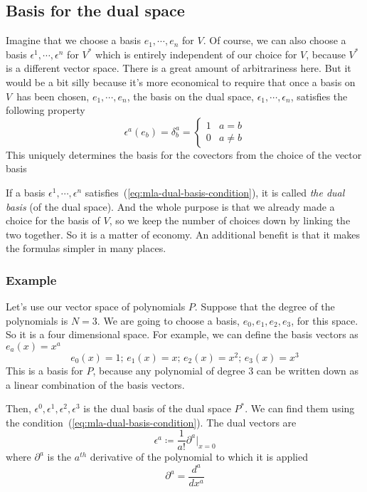 \subsection{Basis for the dual space}
Imagine that we choose a basis $e_1,\cdots,e_n$ for $V$. Of course,  we can also choose a
basis $\epsilon^1,\cdots,\epsilon^n$ for $V^\ast$ which is entirely independent of our choice
for $V$, because $V^\ast$ is a different vector space. There is a great amount of arbitrariness here.
But it would be a bit silly because it's more economical to require that once a basis on $V$\, has
been chosen, $e_1,\cdots,e_n$, the basis on the dual space, $\epsilon_1,\cdots,\epsilon_n$,
satisfies the following property
\begin{equation}\label{eq:mla-dual-basis-condition}
  \epsilon^a (e_b) = \delta_b^a
  = \left\{
    \begin{array}{cc}
      1 & a = b\\
      0 & a \neq b
    \end{array}
  \right.
\end{equation}
This uniquely determines the basis for the covectors from the choice of the vector basis

If a basis $\epsilon^1,\cdots,\epsilon^n$ satisfies~(\ref{eq:mla-dual-basis-condition}), it is
called \emph{the dual basis} (of the dual space). And the whole purpose is that we already
made a choice for the basis of $V$, so we keep the number of choices down by linking the two
together. So it is a matter of economy. An additional benefit is that it makes the formulas simpler
in many places.

\subsubsection{Example}
Let's use our vector space of polynomials $P$. Suppose that the degree of the polynomials is $N=3$.
We are going to choose a basis, $e_0, e_1, e_2, e_3$, for this space. So it is a four dimensional
space.
For example, we can define the basis vectors as $e_a(x) = x^a$
\[
  e_0(x) = 1;\, e_1(x) = x;\, e_2(x) = x^2;\, e_3(x) = x^3
\]
This is a basis for $P$, because any polynomial of degree 3 can be written down as a linear
combination of the basis vectors.

Then, $\epsilon^0, \epsilon^1, \epsilon^2, \epsilon^3$ is the dual basis of the dual space $P^\ast$.
We can find them using the condition~(\ref{eq:mla-dual-basis-condition}).
The dual vectors are
\[
  \epsilon^a \coloneq \frac{1}{a!} \partial^a\big|_{x=0}
\]
where $\partial^a$ is the $a^{th}$ derivative of the polynomial to which it is applied
\[
  \partial^a = \dfrac{d^a}{dx^a}
\]

